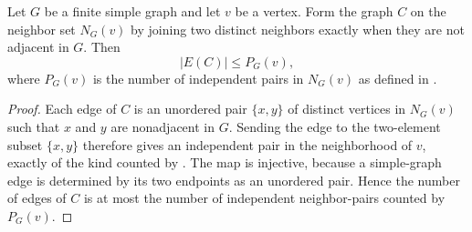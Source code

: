 \begin{helper}
Let $G$ be a finite simple graph and let $v$ be a vertex.  Form the graph
$C$ on the neighbor set $N_G(v)$ by joining two distinct neighbors exactly
when they are not adjacent in $G$.  Then
\[
|E(C)|\le P_G(v),
\]
where $P_G(v)$ is the number of independent pairs in $N_G(v)$ as defined in
.
\end{helper}
\begin{proof}
Each edge of $C$ is an unordered pair $\{x,y\}$ of distinct vertices in
$N_G(v)$ such that $x$ and $y$ are nonadjacent in $G$.  Sending the edge to
the two-element subset $\{x,y\}$ therefore gives an independent pair in the
neighborhood of $v$, exactly of the kind counted by
.  The map is injective, because a simple-graph
edge is determined by its two endpoints as an unordered pair.  Hence the
number of edges of $C$ is at most the number of independent neighbor-pairs
counted by $P_G(v)$.
\end{proof}
